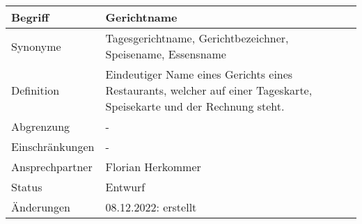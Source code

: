 \begin{table}[H]
    \centering
    \label{gls:gerichtname}
    \begin{tabularx}{\textwidth}{| l | X |}
        \hline
        Begriff         & Gerichtname                                                                                                          \\
        \hline
        Synonyme        & Tagesgerichtname, Gerichtbezeichner, Speisename, Essensname                                                          \\
        \hline
        Definition      & Eindeutiger Name eines Gerichts eines Restaurants, welcher auf einer Tageskarte, Speisekarte und der Rechnung steht. \\
        \hline
        Abgrenzung      & -                                                                                                                    \\
        \hline
        Einschränkungen & -                                                                                                                    \\
        \hline
        Ansprechpartner & Florian Herkommer                                                                                                    \\
        \hline
        Status          & Entwurf                                                                                                              \\
        \hline
        Änderungen      & 08.12.2022: erstellt                                                                                                 \\
        \hline
    \end{tabularx}
\end{table}



